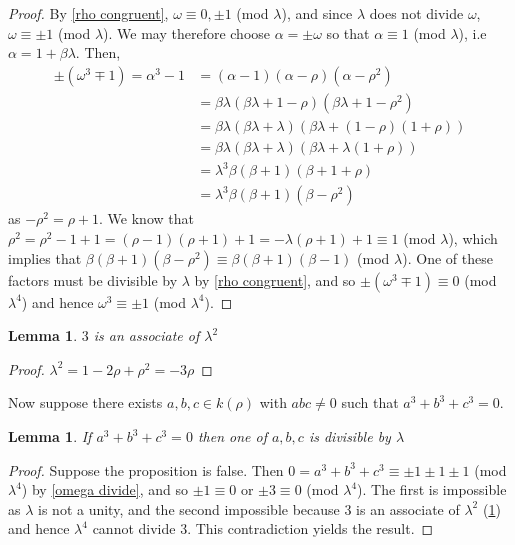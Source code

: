 \documentclass{article}
\newtheorem{lemma}[theorem]{Lemma}
\theoremstyle{definition}
\theoremstyle{definition}
\theoremstyle{definition}
\begin{document}
\begin{proof}
    By \ref{rho congruent}, $\omega\equiv0,\pm1$ (mod $\lambda$), and since $\lambda$ does not divide $\omega$, $\omega\equiv\pm1$ (mod $\lambda$). We may therefore choose $\alpha=\pm\omega$ so that $\alpha \equiv1$ (mod $\lambda$), i.e $\alpha=1+\beta\lambda$. Then, 
    \begin{align*}
\pm(\omega^3\mp1)=\alpha^3-1&=(\alpha-1)(\alpha-\rho)(\alpha-\rho^2)\\
&=\beta\lambda(\beta\lambda+1-\rho)(\beta\lambda+1-\rho^2)\\
&=\beta\lambda(\beta\lambda+\lambda)(\beta\lambda+(1-\rho)(1+\rho))\\
&=\beta\lambda(\beta\lambda+\lambda)(\beta\lambda+\lambda(1+\rho))\\
&=\lambda^3\beta(\beta+1)(\beta+1+\rho)\\
&=\lambda^3\beta(\beta+1)(\beta-\rho^2)
    \end{align*}
    as $-\rho^2=\rho+1$. We know that $\rho^2=\rho^2-1+1=(\rho-1)(\rho+1)+1=-\lambda(\rho+1)+1\equiv1$ (mod $\lambda$), which implies that $\beta(\beta+1)(\beta-\rho^2)\equiv \beta(\beta+1)(\beta-1)$ (mod $\lambda$). One of these factors must be divisible by $\lambda$ by \ref{rho congruent}, and so $\pm(\omega^3\mp1)\equiv0$ (mod $\lambda^4$) and hence $\omega^3\equiv\pm1$ (mod $\lambda^4$).
\end{proof}

\begin{lemma}\label{three assoc}
    $3$ is an associate of $\lambda^2$
\end{lemma}

\begin{proof}
    $\lambda^2=1-2\rho+\rho^2=-3\rho$
\end{proof}
\begin{flushleft}
   Now suppose there exists $a,b,c \in k(\rho)$ with $abc\neq0$ such that $a^3+b^3+c^3=0$.  
\end{flushleft}

\begin{lemma}
   If $a^3+b^3+c^3=0$ then one of $a,b,c$ is divisible by $\lambda$
\end{lemma}

\begin{proof}
    Suppose the proposition is false. Then $0=a^3+b^3+c^3\equiv\pm1\pm1\pm1$ (mod $\lambda^4$) by \ref{omega divide}, and so $\pm1\equiv0$ or $\pm3\equiv0$ (mod $\lambda^4$). The first is impossible as $\lambda$ is not a unity, and the second impossible because 3 is an associate of $\lambda^2$ (\ref{three assoc}) and hence $\lambda^4$ cannot divide $3$. This contradiction yields the result.
    \end{proof}
\end{document}

